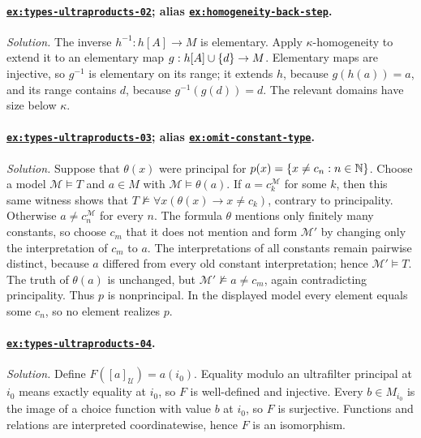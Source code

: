 \documentclass[11pt,oneside,openany]{book}
\theoremstyle{definition}
\theoremstyle{plain}
\theoremstyle{remark}
\DeclarePairedDelimiter{\set}{\lbrace}{\rbrace}
\newcommand{\N}{\mathbb{N}}
\newcommand{\entails}{\models}
\begin{document}
\paragraph{\hyperref[ex:types-ultraproducts-02]{\texttt{ex:types-ultraproducts-02}};
alias \hyperref[ex:homogeneity-back-step]{\texttt{ex:homogeneity-back-step}}.}
\textit{Solution.}  The inverse \(h^{-1}:h[A]\to M\) is elementary.  Apply
\(\kappa\)-homogeneity to extend it to an elementary map
\(g:h[A]\cup\set{d}\to M\).  Elementary maps are injective, so
\(g^{-1}\) is elementary on its range; it extends \(h\), because
\(g(h(a))=a\), and its range contains \(d\), because
\(g^{-1}(g(d))=d\).  The relevant domains have size below \(\kappa\).

\paragraph{\hyperref[ex:types-ultraproducts-03]{\texttt{ex:types-ultraproducts-03}};
alias \hyperref[ex:omit-constant-type]{\texttt{ex:omit-constant-type}}.}
\textit{Solution.}  Suppose that \(\theta(x)\) were principal for
\(p(x)=\set{x\ne c_n:n\in\N}\).  Choose a model \(\mathcal M\models T\) and
\(a\in M\) with \(\mathcal M\models\theta(a)\).  If
\(a=c_k^{\mathcal M}\) for some \(k\), then this same witness shows that
\(T\not\entails\forall x(\theta(x)\to x\ne c_k)\), contrary to principality.
Otherwise \(a\ne c_n^{\mathcal M}\) for every \(n\).  The formula
\(\theta\) mentions only finitely many constants, so choose \(c_m\) that it
does not mention and form \(\mathcal M'\) by changing only the interpretation
of \(c_m\) to \(a\).  The interpretations of all constants remain pairwise
distinct, because \(a\) differed from every old constant interpretation;
hence \(\mathcal M'\models T\).  The truth of \(\theta(a)\) is unchanged,
but \(\mathcal M'\not\models a\ne c_m\), again contradicting principality.
Thus \(p\) is nonprincipal.  In the displayed model every element equals some
\(c_n\), so no element realizes \(p\).

\paragraph{\hyperref[ex:types-ultraproducts-04]{\texttt{ex:types-ultraproducts-04}}.}
\textit{Solution.}  Define
\(F([a]_{\mathcal U})=a(i_0)\).  Equality modulo an ultrafilter principal at
\(i_0\) means exactly equality at \(i_0\), so \(F\) is well-defined and
injective.  Every \(b\in M_{i_0}\) is the image of a choice function with
value \(b\) at \(i_0\), so \(F\) is surjective.  Functions and relations are
interpreted coordinatewise, hence \(F\) is an isomorphism.
\end{document}
